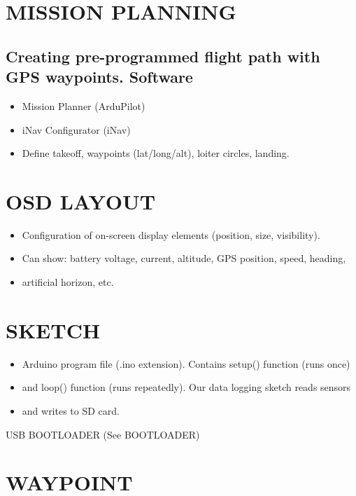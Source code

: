 \documentclass[11pt,letterpaper]{article}
\begin{document}
\section{MISSION PLANNING}

\subsection{Creating pre-programmed flight path with GPS waypoints. Software}

\begin{itemize}
  \item Mission Planner (ArduPilot)
  \item iNav Configurator (iNav)
  \item Define takeoff, waypoints (lat/long/alt), loiter circles, landing.
\end{itemize}

\section{OSD LAYOUT}

\begin{itemize}
  \item Configuration of on-screen display elements (position, size, visibility).
  \item Can show: battery voltage, current, altitude, GPS position, speed, heading,
  \item artificial horizon, etc.
\end{itemize}

\section{SKETCH}

\begin{itemize}
  \item Arduino program file (.ino extension). Contains setup() function (runs once)
  \item and loop() function (runs repeatedly). Our data logging sketch reads sensors
  \item and writes to SD card.
\end{itemize}

USB BOOTLOADER (See BOOTLOADER)\par

\section{WAYPOINT}
\end{document}
